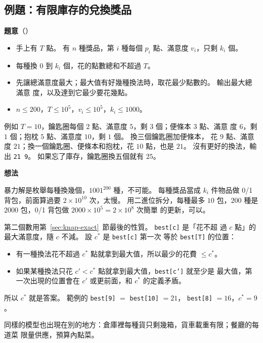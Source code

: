 \subsection{例題：有限庫存的兌換獎品}
\label{sec:ex-prizes}

\textbf{題意}（）

\begin{itemize}
\item 手上有 $T$ 點。 有 $n$ 種獎品，第 $i$ 種每個 $p_i$ 點、滿意度 $v_i$，只剩
$k_i$ 個。
\item 每種換 $0$ 到 $k_i$ 個，花的點數總和不超過 $T$。
\item 先讓總滿意度最大；最大值有好幾種換法時，取花最少點數的。 輸出最大總滿意
度，以及達到它最少要花幾點。
\item $n \le 200$，$T \le 10^5$，$v_i \le 10^5$，$k_i \le 1000$。
\end{itemize}

例如 $T = 10$，鑰匙圈每個 $2$ 點、滿意度 $5$，剩 $3$ 個；便條本 $3$ 點、滿意
度 $6$，剩 $1$ 個；抱枕 $5$ 點、滿意度 $10$，剩 $1$ 個。 換三個鑰匙圈加便條本，
花 $9$ 點、滿意度 $21$；換一個鑰匙圈、便條本和抱枕，花 $10$ 點，也是 $21$。
沒有更好的換法，輸出 \texttt{21 9}。 如果忘了庫存，鑰匙圈換五個就有 $25$。

\textbf{想法}

暴力解是枚舉每種換幾個，$1001^{200}$ 種，不可能。 每種獎品當成 $k_i$ 件物品做
0/1 背包，前面算過要 $2 \times 10^{10}$ 次，太慢。 用二進位拆分，每種最多 $10$
包，$200$ 種是 $2000$ 包，0/1 背包做 $2000 \times 10^5 = 2 \times 10^8$ 次簡單
的更新，可以。

第二個數用第~\ref{sec:knap-exact}~節最後的性質。 \texttt{best[c]} 是「花不超
過 $c$ 點」的最大滿意度，隨 $c$ 不減。 設 $c^*$ 是 \texttt{best[c]} 第一次
等於 \texttt{best[T]} 的位置：

\begin{itemize}
\item 有一種換法花不超過 $c^*$ 點就拿到最大值，所以最少的花費 $\le c^*$。
\item 如果某種換法只花 $c' < c^*$ 點就拿到最大值，\texttt{best[c']} 就至少是
最大值，第一次出現的位置會在 $c'$ 或更前面，和 $c^*$ 的定義矛盾。
\end{itemize}

所以 $c^*$ 就是答案。 範例的 \texttt{best[9]} $=$ \texttt{best[10]} $= 21$，
\texttt{best[8]} $= 16$，$c^* = 9$。

同樣的模型也出現在別的地方：倉庫裡每種貨只剩幾箱，貨車載重有限；餐廳的每道菜
限量供應，預算內點菜。

